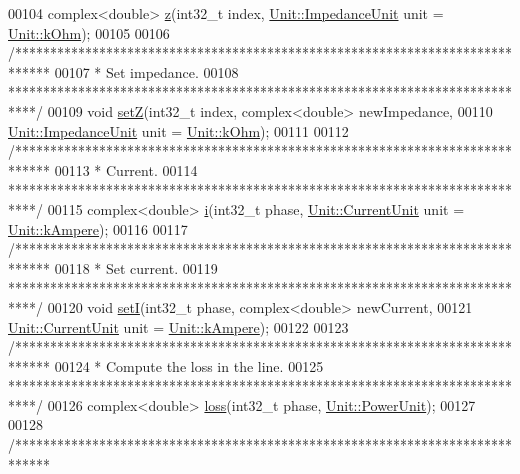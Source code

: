 \begin{DoxyCode}
00104   complex<double>  \hyperlink{group___models_gab5370574fd93e13eb11742f7753fe1f1}{z}(int32\_t index, \hyperlink{class_unit_a3747e779c805df24a71961290be3fbdf}{Unit::ImpedanceUnit} unit = 
      \hyperlink{class_unit_a3747e779c805df24a71961290be3fbdfa6b9c74d1763eefbaf751eeecff0bd9da}{Unit::kOhm});
00105 
00106   \textcolor{comment}{/*****************************************************************************}
00107 \textcolor{comment}{   * Set impedance.}
00108 \textcolor{comment}{   ****************************************************************************/}
00109   \textcolor{keywordtype}{void} \hyperlink{group___models_ga409df7d11f5c5d594a13fb2f74b3b9e0}{setZ}(int32\_t index, complex<double> newImpedance,
00110             \hyperlink{class_unit_a3747e779c805df24a71961290be3fbdf}{Unit::ImpedanceUnit} unit = \hyperlink{class_unit_a3747e779c805df24a71961290be3fbdfa6b9c74d1763eefbaf751eeecff0bd9da}{Unit::kOhm});
00111 
00112   \textcolor{comment}{/*****************************************************************************}
00113 \textcolor{comment}{   * Current.}
00114 \textcolor{comment}{   ****************************************************************************/}
00115   complex<double> \hyperlink{group___models_gaf81e7055102816465bdf7e19afc2d547}{i}(int32\_t phase, \hyperlink{class_unit_a0794cf6c9682f48296dd4a5315389787}{Unit::CurrentUnit} unit = 
      \hyperlink{class_unit_a0794cf6c9682f48296dd4a5315389787a368a3c470f0b590a6100dda717a7dd4f}{Unit::kAmpere});
00116 
00117   \textcolor{comment}{/*****************************************************************************}
00118 \textcolor{comment}{   * Set current.}
00119 \textcolor{comment}{   ****************************************************************************/}
00120   \textcolor{keywordtype}{void} \hyperlink{group___models_ga9e55b06dc3e385838fdd13d5580438ef}{setI}(int32\_t phase, complex<double> newCurrent,
00121             \hyperlink{class_unit_a0794cf6c9682f48296dd4a5315389787}{Unit::CurrentUnit} unit = \hyperlink{class_unit_a0794cf6c9682f48296dd4a5315389787a368a3c470f0b590a6100dda717a7dd4f}{Unit::kAmpere});
00122 
00123   \textcolor{comment}{/*****************************************************************************}
00124 \textcolor{comment}{   * Compute the loss in the line.}
00125 \textcolor{comment}{   ****************************************************************************/}
00126   complex<double> \hyperlink{group___models_ga7909d69e419de3f460ca7abab3d91e53}{loss}(int32\_t phase, \hyperlink{class_unit_ace265ae255370ccacfd5370337572c3b}{Unit::PowerUnit});
00127 
00128   \textcolor{comment}{/*****************************************************************************}

\end{DoxyCode}

